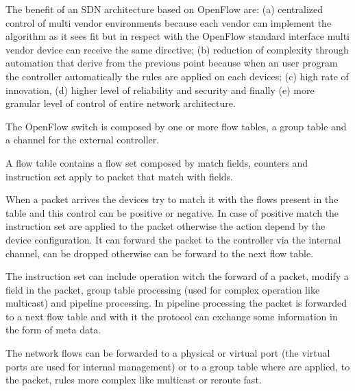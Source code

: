 The benefit of an \ac{SDN} architecture based on OpenFlow are: (a) centralized control of multi vendor environments because each vendor can implement the algorithm as it sees fit but in respect with the OpenFlow standard interface multi vendor device can receive the same directive; (b) reduction of complexity through automation that derive from the previous point because when an user program the controller automatically the rules are applied on each devices; (c) high rate of innovation, (d) higher level of reliability and security and finally (e) more granular level of control of entire network architecture.

The OpenFlow switch is composed by one or more flow tables, a group table and a channel for the external controller.

A flow table contains a flow set composed by match fields, counters and instruction set apply to packet that match with fields.

When a packet arrives the devices try to match it with the flows present in the table and this control can be positive or negative. In case of positive match the instruction set are applied to the packet otherwise the action depend by the device configuration. It can forward the packet to the controller via the internal channel, can be dropped otherwise can be forward to the next flow table.

The instruction set can include operation witch the forward of a packet, modify a field in the packet, group table processing (used for complex operation like multicast) and pipeline processing. In pipeline processing the packet is forwarded to a next flow table and with it the protocol can exchange some information in the form of meta data.

The network flows can be forwarded to a physical or virtual port (the virtual ports are used for internal management) or to a group table where are applied, to the packet, rules more complex like multicast or reroute fast.